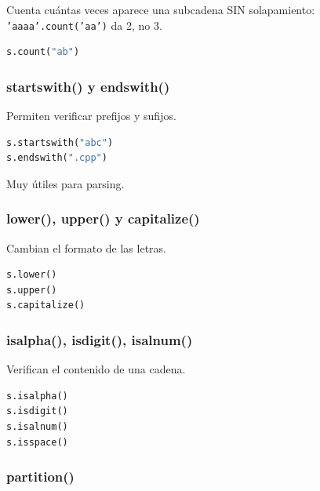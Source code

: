 Cuenta cuántas veces aparece una subcadena SIN solapamiento: \texttt{'aaaa'.count('aa')} da 2, no 3.

\begin{lstlisting}[language=Python]
s.count("ab")
\end{lstlisting}

\vspace{0.3cm}

\subsubsection{startswith() y endswith()}

Permiten verificar prefijos y sufijos.

\begin{lstlisting}[language=Python]
s.startswith("abc")
s.endswith(".cpp")
\end{lstlisting}

Muy útiles para parsing.

\vspace{0.3cm}

\subsubsection{lower(), upper() y capitalize()}

Cambian el formato de las letras.

\begin{lstlisting}[language=Python]
s.lower()
s.upper()
s.capitalize()
\end{lstlisting}

\vspace{0.3cm}

\subsubsection{isalpha(), isdigit(), isalnum()}

Verifican el contenido de una cadena.

\begin{lstlisting}[language=Python]
s.isalpha()
s.isdigit()
s.isalnum()
s.isspace()
\end{lstlisting}

\vspace{0.3cm}

\subsubsection{partition()}


